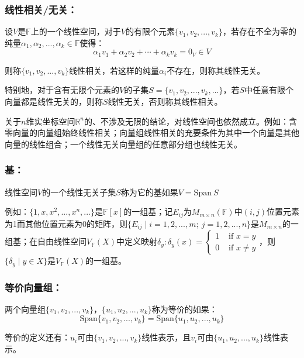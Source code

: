 \documentclass[zihao=5,UTF8]{report}
\theoremstyle{mystyle} %
\begin{document}
\subsubsection{线性相关/无关：}
设$V$是$\mathbb{F}$上的一个线性空间，对于$V$的有限个元素$\{v_1,v_2,...,v_k\}$，若存在不全为零的纯量$\alpha_1,\alpha_2,...,\alpha_k \in \mathbb{F}$使得：
\begin{equation*}
    \alpha_1v_1+\alpha_2v_2+\cdots+\alpha_kv_k=0_V \in V
\end{equation*}\par
则称$\{v_1,v_2,...,v_k\}$线性相关，若这样的纯量$\alpha_i$不存在，则称其线性无关。\par
特别地，对于含有无限个元素的$V$的子集$S = \{v_1,v_2,...,v_k,...\}$，若$S$中任意有限个向量都是线性无关的，则称$S$线性无关，否则称其线性相关。\par
{\color{gray}\small 
关于$n$维实坐标空间$\mathbb{R}^n$的、不涉及无限的结论，对线性空间也依然成立。例如：含零向量的向量组始终线性相关；向量组线性相关的充要条件为其中一个向量是其他向量的线性组合；一个线性无关向量组的任意部分组也线性无关。
}

\subsubsection{基：}
线性空间$V$的一个线性无关子集$S$称为它的基如果$V = \text{Span}\ S$\par
{\color{gray}\small 
例如：$\{1,x,x^2,...,x^n,...\}$是$\mathbb{F}[x]$的一组基；记$E_{ij}$为$M_{m\times n}(\mathbb{F})$中$(i,j)$位置元素为1而其他位置元素为0的矩阵，则$\{E_{ij}\mid i = 1,2,...,m;\ j = 1,2,...,n\}$是$M_{m\times n}$的一组基；在自由线性空间$V_{\mathbb{F}}(X)$中定义映射$\delta_y:\delta_y(x) = \begin{cases}
    1 & \text{ if } x= y\\
    0 & \text{ if } x\ne y
   \end{cases}$，则$\{\delta_y\mid y\in X \}$是$V_{\mathbb{F}}(X)$的一组基。
}

\subsubsection{等价向量组：}
两个向量组$\{v_1,v_2,...,v_k\}$，$\{u_1,u_2,...,u_k\}$称为等价的如果：
\begin{equation*}
    \text{Span} \{v_1,v_2,...,v_k\} = \text{Span} \{u_1,u_2,...,u_k\}
\end{equation*}\par
等价的定义还有：$u_i$可由$\{v_1,v_2,...,v_k\}$线性表示，且$v_i$可由$\{u_1,u_2,...,u_k\}$线性表示。
\end{document}
